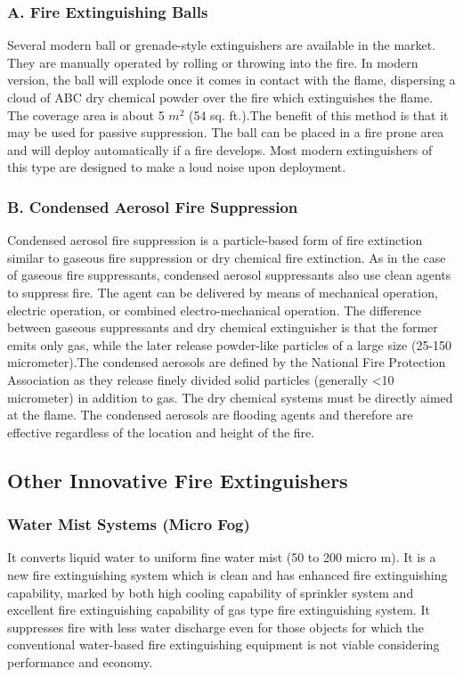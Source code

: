 \documentclass[11pt]{article} %
\begin{document}
\begin{multicols}{2}
\subsubsection*{A. Fire Extinguishing Balls}
Several modern ball or grenade-style extinguishers are available in the market. They 
are manually operated by rolling or throwing into the fire. In modern version, the ball 
will explode once it comes in contact with the flame, dispersing a cloud of ABC dry 
chemical powder over the fire which extinguishes the flame. The coverage area is 
about 5 $m^2$ (54 sq. ft.).The benefit of this method is that it may be used for passive 
suppression. The ball can be placed in a fire prone area and will deploy automatically 
if a fire develops. Most modern extinguishers of this type are designed to make a loud 
noise upon deployment.

\subsubsection*{B. Condensed Aerosol Fire Suppression}
 Condensed aerosol fire suppression is a particle-based form of fire extinction 
similar to gaseous fire suppression or dry chemical fire extinction. As in the case of
gaseous fire suppressants, condensed aerosol suppressants also use clean agents to 
suppress fire. The agent can be delivered by means of mechanical operation, electric 
operation, or combined electro-mechanical operation. The difference between gaseous 
suppressants and dry chemical extinguisher is that the former emits only gas, while the 
later release powder-like particles of a large size (25-150 micrometer).The condensed aerosols 
are defined by the National Fire Protection Association as they release finely divided 
solid particles (generally <10 micrometer) in addition to gas.
The dry chemical systems must be directly aimed at the flame. The condensed 
aerosols are flooding agents and therefore are effective regardless of the location and 
height of the fire. 

\subsection*{Other Innovative Fire Extinguishers}

\subsubsection*{Water Mist Systems (Micro Fog)}
It converts liquid water to uniform fine water mist (50 to 200 micro m). It is a new 
fire extinguishing system which is clean and has enhanced fire extinguishing 
capability, marked by both high cooling capability of sprinkler system and 
excellent fire extinguishing capability of gas type fire extinguishing system. It 
suppresses fire with less water discharge even for those objects for which the 
conventional water-based fire extinguishing equipment is not viable considering
performance and economy.


\end{multicols}
\end{document}
